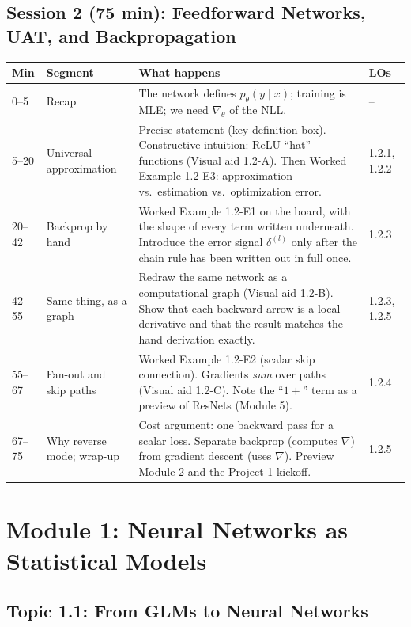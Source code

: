 \documentclass[11pt]{article}
\begin{document}
\subsection*{Session 2 (75 min): Feedforward Networks, UAT, and Backpropagation}
\begin{longtable}{@{}p{1.4cm}p{3.2cm}p{8.9cm}p{1.6cm}@{}}
\toprule
\textbf{Min} & \textbf{Segment} & \textbf{What happens} & \textbf{LOs} \\
\midrule
\endhead
0--5 & Recap & The network defines $p_\theta(y\mid x)$; training is MLE; we need $\nabla_\theta$ of the NLL. & -- \\
5--20 & Universal approximation & Precise statement (key-definition box). Constructive intuition: ReLU ``hat'' functions (Visual aid 1.2-A). Then Worked Example 1.2-E3: approximation vs.\ estimation vs.\ optimization error. & 1.2.1, 1.2.2 \\
20--42 & Backprop by hand & Worked Example 1.2-E1 on the board, with the shape of every term written underneath. Introduce the error signal $\delta^{(l)}$ only after the chain rule has been written out in full once. & 1.2.3 \\
42--55 & Same thing, as a graph & Redraw the same network as a computational graph (Visual aid 1.2-B). Show that each backward arrow is a local derivative and that the result matches the hand derivation exactly. & 1.2.3, 1.2.5 \\
55--67 & Fan-out and skip paths & Worked Example 1.2-E2 (scalar skip connection). Gradients \emph{sum} over paths (Visual aid 1.2-C). Note the ``$1 +$'' term as a preview of ResNets (Module 5). & 1.2.4 \\
67--75 & Why reverse mode; wrap-up & Cost argument: one backward pass for a scalar loss. Separate backprop (computes $\nabla$) from gradient descent (uses $\nabla$). Preview Module 2 and the Project 1 kickoff. & 1.2.5 \\
\bottomrule
\end{longtable}

\clearpage
\section{Module 1: Neural Networks as Statistical Models}

\subsection{Topic 1.1: From GLMs to Neural Networks}
\end{document}
